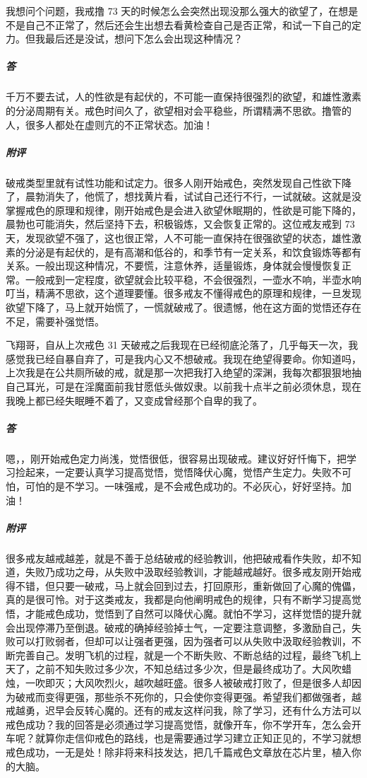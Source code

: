 \begin{case}
    我想问个问题，我戒撸 73 天的时候怎么会突然出现没那么强大的欲望了，在想是不是自己不正常了，然后还会生出想去看黄检查自己是否正常，和试一下自己的定力。但我最后还是没试，想问下怎么会出现这种情况？
    \subparagraph{答} 千万不要去试，人的性欲是有起伏的，不可能一直保持很强烈的欲望，和雄性激素的分泌周期有关。戒色时间久了，欲望相对会平稳些，所谓精满不思欲。撸管的人，很多人都处在虚则亢的不正常状态。加油！
    \subparagraph{附评} 破戒类型里就有试性功能和试定力。很多人刚开始戒色，突然发现自己性欲下降了，晨勃消失了，他慌了，想找黄片看，试试自己还行不行，一试就破。这就是没掌握戒色的原理和规律，刚开始戒色是会进入欲望休眠期的，性欲是可能下降的，晨勃也可能消失，然后坚持下去，积极锻炼，又会恢复正常的。这位戒友戒到 73 天，发现欲望不强了，这也很正常，人不可能一直保持在很强欲望的状态，雄性激素的分泌是有起伏的，是有高潮和低谷的，和季节有一定关系，和饮食锻炼等都有关系。一般出现这种情况，不要慌，注意休养，适量锻炼，身体就会慢慢恢复正常。一般戒到一定程度，欲望就会比较平稳，不会很强烈，一壶水不响，半壶水响叮当，精满不思欲，这个道理要懂。很多戒友不懂得戒色的原理和规律，一旦发现欲望下降了，马上就开始慌了，一慌就破戒了。很遗憾，他在这方面的觉悟还存在不足，需要补强觉悟。
\end{case}

\begin{case}
    飞翔哥，自从上次戒色 31 天破戒之后我现在已经彻底沦落了，几乎每天一次，我感觉我已经自暴自弃了，可是我内心又不想破戒。我现在绝望得要命。你知道吗，上次我是在公共厕所破的戒，就是那一次把我打入绝望的深渊，我每次都狠狠地抽自己耳光，可是在淫魔面前我甘愿低头做奴隶。以前我十点半之前必须休息，现在我晚上都已经失眠睡不着了，又变成曾经那个自卑的我了。
    \subparagraph{答} 嗯，，刚开始戒色定力尚浅，觉悟很低，很容易出现破戒。建议好好忏悔下，把学习捡起来，一定要认真学习提高觉悟，觉悟降伏心魔，觉悟产生定力。失败不可怕，可怕的是不学习。一味强戒，是不会戒色成功的。不必灰心，好好坚持。加油！
    \subparagraph{附评} 很多戒友越戒越差，就是不善于总结破戒的经验教训，他把破戒看作失败，却不知道，失败乃成功之母，从失败中汲取经验教训，才能越戒越好。很多戒友刚开始戒得不错，但只要一破戒，马上就会回到过去，打回原形，重新做回了心魔的傀儡，真的是很可怜。对于这类戒友，我都是向他阐明戒色的规律，只有不断学习提高觉悟，才能戒色成功，觉悟到了自然可以降伏心魔。就怕不学习，这样觉悟的提升就会出现停滞乃至倒退。破戒的确掉经验掉士气，一定要注意调整，多激励自己，失败可以打败弱者，但却可以让强者更强，因为强者可以从失败中汲取经验教训，不断完善自己。发明飞机的过程，就是一个不断失败、不断总结的过程，最终飞机上天了，之前不知失败过多少次，不知总结过多少次，但是最终成功了。大风吹蜡烛，一吹即灭；大风吹烈火，越吹越旺盛。很多人被破戒打败了，但是很多人却因为破戒而变得更强，那些杀不死你的，只会使你变得更强。希望我们都做强者，越戒越勇，迟早会反转心魔的。还有的戒友这样问我，除了学习，还有什么方法可以戒色成功？我的回答是必须通过学习提高觉悟，就像开车，你不学开车，怎么会开车呢？就算你走信仰戒色的路线，也是需要通过学习建立正知正见的，不学习就想戒色成功，一无是处！除非将来科技发达，把几千篇戒色文章放在芯片里，植入你的大脑。
\end{case}

